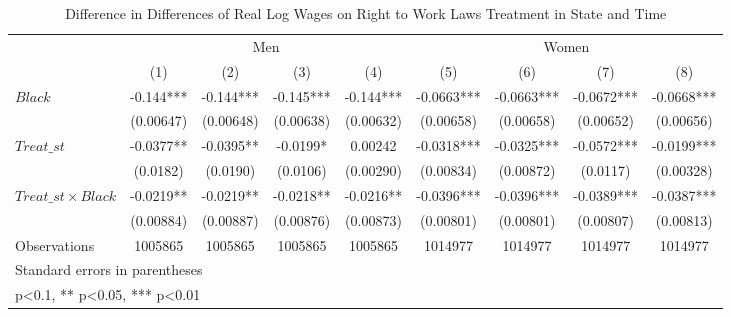 \begin{table}[htbp]\centering
\def\sym#1{\ifmmode^{#1}\else\(^{#1}\)\fi}
\caption{Difference in Differences of Real Log Wages on Right to Work Laws Treatment in State and Time}
\begin{tabular}{l*{8}{c}}
\hline\hline
                    &\multicolumn{4}{c}{Men}                                        &\multicolumn{4}{c}{Women}                                      \\\cmidrule(lr){2-5}\cmidrule(lr){6-9}
                    &\multicolumn{1}{c}{(1)}   &\multicolumn{1}{c}{(2)}   &\multicolumn{1}{c}{(3)}   &\multicolumn{1}{c}{(4)}   &\multicolumn{1}{c}{(5)}   &\multicolumn{1}{c}{(6)}   &\multicolumn{1}{c}{(7)}   &\multicolumn{1}{c}{(8)}   \\
\hline
$ Black $           &      -0.144***&      -0.144***&      -0.145***&      -0.144***&     -0.0663***&     -0.0663***&     -0.0672***&     -0.0668***\\
                    &   (0.00647)   &   (0.00648)   &   (0.00638)   &   (0.00632)   &   (0.00658)   &   (0.00658)   &   (0.00652)   &   (0.00656)   \\
[1em]
$ Treat\_{st} $      &     -0.0377** &     -0.0395** &     -0.0199*  &     0.00242   &     -0.0318***&     -0.0325***&     -0.0572***&     -0.0199***\\
                    &    (0.0182)   &    (0.0190)   &    (0.0106)   &   (0.00290)   &   (0.00834)   &   (0.00872)   &    (0.0117)   &   (0.00328)   \\
[1em]
$ Treat\_{st} \times Black $&     -0.0219** &     -0.0219** &     -0.0218** &     -0.0216** &     -0.0396***&     -0.0396***&     -0.0389***&     -0.0387***\\
                    &   (0.00884)   &   (0.00887)   &   (0.00876)   &   (0.00873)   &   (0.00801)   &   (0.00801)   &   (0.00807)   &   (0.00813)   \\
\hline
Observations        &     1005865   &     1005865   &     1005865   &     1005865   &     1014977   &     1014977   &     1014977   &     1014977   \\
\hline\hline
\multicolumn{9}{l}{\footnotesize Standard errors in parentheses}\\
\multicolumn{9}{l}{\footnotesize * p<0.1, ** p<0.05, *** p<0.01}\\
\end{tabular}
\end{table}
